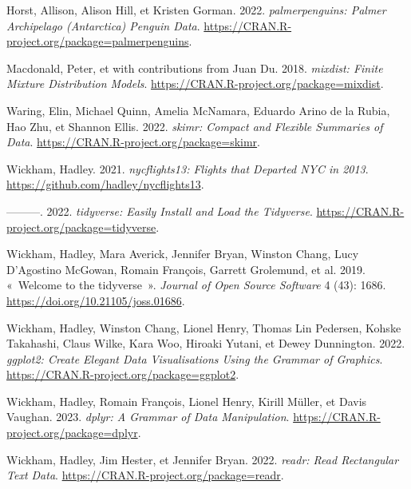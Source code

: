 \documentclass[
  a4paper,
  DIV=11,
  numbers=noendperiod,
  oneside]{scrreprt}
\newlength{\cslhangindent}
\newlength{\cslentryspacingunit} %
\newenvironment{CSLReferences}[2] %
 {%
  \setlength{\parindent}{0pt}
  \ifodd #1
  \let\oldpar\par
  \def\par{\hangindent=\cslhangindent\oldpar}
  \fi
  \setlength{\parskip}{#2\cslentryspacingunit}
 }%
 {}
\begin{document}
\hypertarget{refs}{}
\begin{CSLReferences}{1}{0}
\leavevmode{}%
Horst, Allison, Alison Hill, et Kristen Gorman. 2022.
\emph{palmerpenguins: Palmer Archipelago (Antarctica) Penguin Data}.
\url{https://CRAN.R-project.org/package=palmerpenguins}.

\leavevmode{}%
Macdonald, Peter, et with contributions from Juan Du. 2018.
\emph{mixdist: Finite Mixture Distribution Models}.
\url{https://CRAN.R-project.org/package=mixdist}.

\leavevmode{}%
Waring, Elin, Michael Quinn, Amelia McNamara, Eduardo Arino de la Rubia,
Hao Zhu, et Shannon Ellis. 2022. \emph{skimr: Compact and Flexible
Summaries of Data}. \url{https://CRAN.R-project.org/package=skimr}.

\leavevmode{}%
Wickham, Hadley. 2021. \emph{nycflights13: Flights that Departed NYC in
2013}. \url{https://github.com/hadley/nycflights13}.

\leavevmode{}%
---------. 2022. \emph{tidyverse: Easily Install and Load the
Tidyverse}. \url{https://CRAN.R-project.org/package=tidyverse}.

\leavevmode{}%
Wickham, Hadley, Mara Averick, Jennifer Bryan, Winston Chang, Lucy
D'Agostino McGowan, Romain François, Garrett Grolemund, et al. 2019.
{«~Welcome to the {tidyverse}~»}. \emph{Journal of Open Source Software}
4 (43): 1686. \url{https://doi.org/10.21105/joss.01686}.

\leavevmode{}%
Wickham, Hadley, Winston Chang, Lionel Henry, Thomas Lin Pedersen,
Kohske Takahashi, Claus Wilke, Kara Woo, Hiroaki Yutani, et Dewey
Dunnington. 2022. \emph{ggplot2: Create Elegant Data Visualisations
Using the Grammar of Graphics}.
\url{https://CRAN.R-project.org/package=ggplot2}.

\leavevmode{}%
Wickham, Hadley, Romain François, Lionel Henry, Kirill Müller, et Davis
Vaughan. 2023. \emph{dplyr: A Grammar of Data Manipulation}.
\url{https://CRAN.R-project.org/package=dplyr}.

\leavevmode{}%
Wickham, Hadley, Jim Hester, et Jennifer Bryan. 2022. \emph{readr: Read
Rectangular Text Data}. \url{https://CRAN.R-project.org/package=readr}.

\end{CSLReferences}
\end{document}

